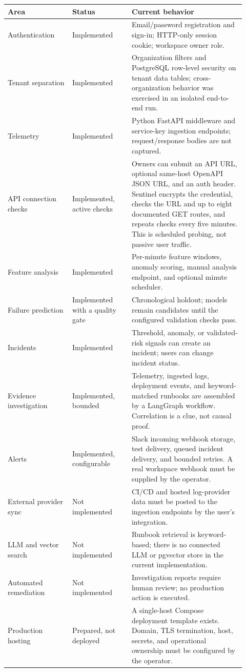 \documentclass[11pt,a4paper]{article}
\begin{document}
\begin{longtable}{p{0.25\linewidth}p{0.23\linewidth}p{0.44\linewidth}}
\toprule
\textbf{Area} & \textbf{Status} & \textbf{Current behavior} \\
\midrule
Authentication & Implemented & Email/password registration and sign-in;
HTTP-only session cookie; workspace owner role. \\
Tenant separation & Implemented & Organization filters and PostgreSQL row-level
security on tenant data tables; cross-organization behavior was exercised in
an isolated end-to-end run. \\
Telemetry & Implemented & Python FastAPI middleware and service-key ingestion
endpoints; request/response bodies are not captured. \\
API connection checks & Implemented, active checks & Owners can submit an API URL,
optional same-host OpenAPI JSON URL, and an auth header. Sentinel encrypts the
credential, checks the URL and up to eight documented GET routes, and repeats
checks every five minutes. This is scheduled probing, not passive user traffic. \\
Feature analysis & Implemented & Per-minute feature windows, anomaly scoring,
manual analysis endpoint, and optional minute scheduler. \\
Failure prediction & Implemented with a quality gate & Chronological holdout;
models remain candidates until the configured validation checks pass. \\
Incidents & Implemented & Threshold, anomaly, or validated-risk signals can
create an incident; users can change incident status. \\
Evidence investigation & Implemented, bounded & Telemetry, ingested logs,
deployment events, and keyword-matched runbooks are assembled by a LangGraph
workflow. Correlation is a clue, not causal proof. \\
Alerts & Implemented, configurable & Slack incoming webhook storage, test
delivery, queued incident delivery, and bounded retries. A real workspace
webhook must be supplied by the operator. \\
External provider sync & Not implemented & CI/CD and hosted log-provider data
must be posted to the ingestion endpoints by the user's integration. \\
LLM and vector search & Not implemented & Runbook retrieval is keyword-based;
there is no connected LLM or pgvector store in the current implementation. \\
Automated remediation & Not implemented & Investigation reports require human
review; no production action is executed. \\
Production hosting & Prepared, not deployed & A single-host Compose deployment
template exists. Domain, TLS termination, host, secrets, and operational
ownership must be configured by the operator. \\
\bottomrule
\end{longtable}
\end{document}
